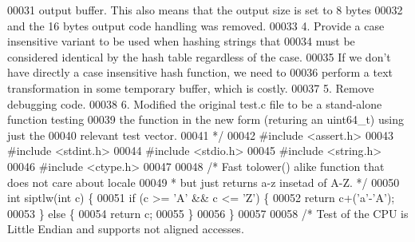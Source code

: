 \begin{DoxyCode}
{00031 \textcolor{comment}{      output buffer. This also means that the output size is set to 8 bytes}
00032 \textcolor{comment}{      and the 16 bytes output code handling was removed.}
00033 \textcolor{comment}{   4. Provide a case insensitive variant to be used when hashing strings that}
00034 \textcolor{comment}{      must be considered identical by the hash table regardless of the case.}
00035 \textcolor{comment}{      If we don't have directly a case insensitive hash function, we need to}
00036 \textcolor{comment}{      perform a text transformation in some temporary buffer, which is costly.}
00037 \textcolor{comment}{   5. Remove debugging code.}
00038 \textcolor{comment}{   6. Modified the original test.c file to be a stand-alone function testing}
00039 \textcolor{comment}{      the function in the new form (returing an uint64\_t) using just the}
00040 \textcolor{comment}{      relevant test vector.}
00041 \textcolor{comment}{ */}
00042 \textcolor{preprocessor}{#}\textcolor{preprocessor}{include} \textcolor{preprocessor}{<}\textcolor{preprocessor}{assert}\textcolor{preprocessor}{.}\textcolor{preprocessor}{h}\textcolor{preprocessor}{>}
00043 \textcolor{preprocessor}{#}\textcolor{preprocessor}{include} \textcolor{preprocessor}{<}\textcolor{preprocessor}{stdint}\textcolor{preprocessor}{.}\textcolor{preprocessor}{h}\textcolor{preprocessor}{>}
00044 \textcolor{preprocessor}{#}\textcolor{preprocessor}{include} \textcolor{preprocessor}{<}\textcolor{preprocessor}{stdio}\textcolor{preprocessor}{.}\textcolor{preprocessor}{h}\textcolor{preprocessor}{>}
00045 \textcolor{preprocessor}{#}\textcolor{preprocessor}{include} \textcolor{preprocessor}{<}\textcolor{preprocessor}{string}\textcolor{preprocessor}{.}\textcolor{preprocessor}{h}\textcolor{preprocessor}{>}
00046 \textcolor{preprocessor}{#}\textcolor{preprocessor}{include} \textcolor{preprocessor}{<}\textcolor{preprocessor}{ctype}\textcolor{preprocessor}{.}\textcolor{preprocessor}{h}\textcolor{preprocessor}{>}
00047 
00048 \textcolor{comment}{/* Fast tolower() alike function that does not care about locale}
00049 \textcolor{comment}{ * but just returns a-z insetad of A-Z. */}
00050 \textcolor{keywordtype}{int} siptlw(\textcolor{keywordtype}{int} c) \{
00051     \textcolor{keywordflow}{if} (c >= \textcolor{stringliteral}{'A'} && c <= \textcolor{stringliteral}{'Z'}) \{
00052         \textcolor{keywordflow}{return} c+(\textcolor{stringliteral}{'a'}-\textcolor{stringliteral}{'A'});
00053     \} \textcolor{keywordflow}{else} \{
00054         \textcolor{keywordflow}{return} c;
00055     \}
00056 \}
00057 
00058 \textcolor{comment}{/* Test of the CPU is Little Endian and supports not aligned accesses.}
}
\end{DoxyCode}
